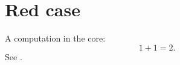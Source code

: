 \chapter{Red case}\label{c99}

A computation in the core:
\begin{equation}\label{c99.eq.eins}
  1 + 1 = 2.
\end{equation}
See .
